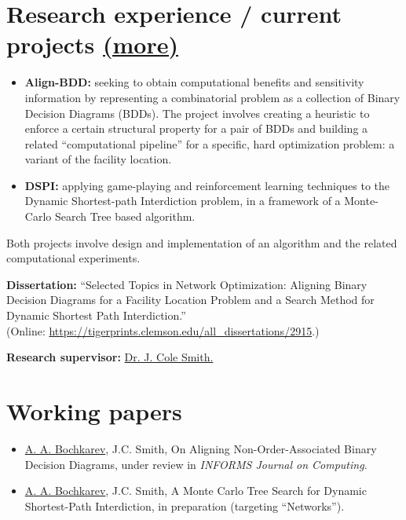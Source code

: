 \documentclass[11pt]{article} \usepackage{geometry} %
\newcommand{\mhref}[1]{\hfill\href{#1}{\small (more\faExternalLink*)}}
\begin{document}
  \section*{Research experience / current projects \mhref{https://www.bochkarev.io/research/}}
  \begin{itemize}
    \itemsep0pt
  \item \textbf{Align-BDD:} seeking to obtain computational benefits and
    sensitivity information by representing a combinatorial problem as a
    collection of Binary Decision Diagrams (BDDs). The project involves creating a heuristic to enforce a
    certain structural property for a pair of BDDs and building a related
    ``computational pipeline'' for a specific, hard optimization problem: a
    variant of the facility location. 
  \item \textbf{DSPI:} applying game-playing and reinforcement
    learning techniques to the Dynamic Shortest-path Interdiction problem,
    in a framework of a Monte-Carlo Search Tree based algorithm.
  \end{itemize} 
  Both projects involve design and implementation of an algorithm and
  the related computational experiments.\vspace{0.5em}

  \noindent\textbf{Dissertation:} ``Selected Topics in Network Optimization:
  Aligning Binary Decision Diagrams for a Facility Location Problem and a Search
  Method for Dynamic Shortest Path Interdiction.''\\
  \noindent (Online: \href{https://tigerprints.clemson.edu/all_dissertations/2915}{https://tigerprints.clemson.edu/all\_dissertations/2915}.)
  \vspace{0.5em}

  \noindent\textbf{Research supervisor:}
  \href{https://scholar.google.com/citations?user=87CaUHYAAAAJ&hl=en}{Dr. J. Cole
    Smith.}
  \vspace{1.5em}

 \section*{Working papers}
 \begin{itemize}
    \itemsep0pt
    \item \underline{A. A. Bochkarev}, J.C. Smith, On Aligning
    Non-Order-Associated Binary Decision Diagrams, under review in \textit{INFORMS Journal on Computing}.
  \item \underline{A. A. Bochkarev}, J.C. Smith, A Monte Carlo Tree Search for
    Dynamic Shortest-Path Interdiction, in preparation (targeting ``Networks'').
 \end{itemize}
\end{document}
